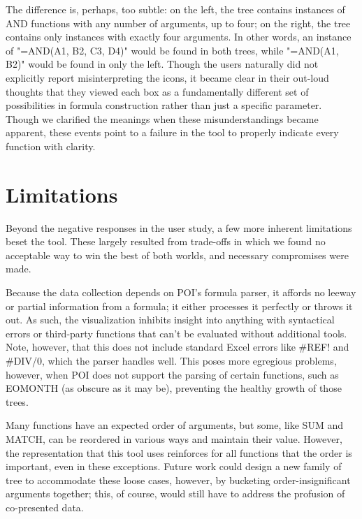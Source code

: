 \documentclass[conference]{IEEEtran}
\begin{document}
	The difference is, perhaps, too subtle: on the left, the tree contains
	instances of AND functions with any number of arguments, up to four; on the
	right, the tree contains only instances with exactly four arguments. In other
	words, an instance of "=AND(A1, B2, C3, D4)" would be found in both trees,
	while "=AND(A1, B2)" would be found in only the left. Though the users
	naturally did not explicitly report misinterpreting the icons, it became clear
	in their out-loud thoughts that they viewed each box as a fundamentally
	different set of possibilities in formula construction rather than just a
	specific parameter. Though we clarified the meanings when these
	misunderstandings became apparent, these events point to a failure in the tool
	to properly indicate every function with clarity.   \par
	
	
	
	\section{Limitations} Beyond the negative responses in the user study, a few
	more inherent limitations beset the tool. These largely resulted from
	trade-offs in which we found no acceptable way to win the best of both worlds,
	and necessary compromises were made. \par
	
	Because the data collection depends on POI's formula parser, it affords no
	leeway or partial information from a formula; it either processes it perfectly
	or throws it out. As such, the visualization inhibits insight into anything
	with syntactical errors or third-party functions that can't be evaluated
	without additional tools. Note, however, that this does not include standard
	Excel errors like \#REF! and \#DIV/0, which the parser handles well. This poses
	more egregious problems, however, when POI does not support the parsing of
	certain functions, such as EOMONTH (as obscure as it may be), preventing the
	healthy growth of those trees. \par
	
	Many functions have an expected order of arguments, but some, like SUM and
	MATCH, can be reordered in various ways and maintain their value. However, the
	representation that this tool uses reinforces for all functions that the order
	is important, even in these exceptions. Future work could design a new family
	of tree to accommodate these loose cases, however, by bucketing
	order-insignificant arguments together; this, of course, would still have to
	address the profusion of co-presented data. \par
	
\end{document}
